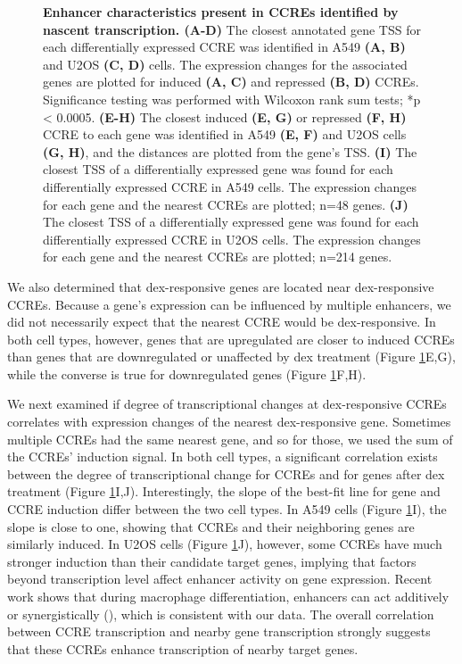 \documentclass{article}
\begin{document}
{\begin{figure}[hb]
\caption{\textbf{Enhancer characteristics present in CCREs identified by nascent transcription. (A-D)} The closest annotated gene TSS for each differentially expressed CCRE was identified in A549 \textbf{(A, B)} and U2OS \textbf{(C, D)} cells. The expression changes for the associated genes are plotted for induced \textbf{(A, C)} and repressed \textbf{(B, D)} CCREs. Significance testing was performed with Wilcoxon rank sum tests; *p < 0.0005. \textbf{(E-H)} The closest induced \textbf{(E, G)} or repressed \textbf{(F, H)} CCRE to each gene was identified in A549 \textbf{(E, F)} and U2OS cells \textbf{(G, H)}, and the distances are plotted from the gene’s TSS. \textbf{(I)} The closest TSS of a differentially expressed gene was found for each differentially expressed CCRE in A549 cells. The expression changes for each gene and the nearest CCREs are plotted; n=48 genes. \textbf{(J)} The closest TSS of a differentially expressed gene was found for each differentially expressed CCRE in U2OS cells. The expression changes for each gene and the nearest CCREs are plotted; n=214 genes.}
\label{fig:fig4}
\end{figure}
We also determined that dex-responsive genes are located near dex-responsive CCREs. Because a gene’s expression can be influenced by multiple enhancers, we did not necessarily expect that the nearest CCRE would be dex-responsive. In both cell types, however, genes that are upregulated are closer to induced CCREs than genes that are downregulated or unaffected by dex treatment (Figure \ref{fig:fig4}E,G), while the converse is true for downregulated genes (Figure \ref{fig:fig4}F,H).  

We next examined if degree of transcriptional changes at dex-responsive CCREs correlates with expression changes of the nearest dex-responsive gene. Sometimes multiple CCREs had the same nearest gene, and so for those, we used the sum of the CCREs’ induction signal. In both cell types, a significant correlation exists between the degree of transcriptional change for CCREs and for genes after dex treatment (Figure \ref{fig:fig4}I,J). Interestingly, the slope of the best-fit line for gene and CCRE induction differ between the two cell types. In A549 cells (Figure \ref{fig:fig4}I), the slope is close to one, showing that CCREs and their neighboring genes are similarly induced. In U2OS cells (Figure \ref{fig:fig4}J), however, some CCREs have much stronger induction than their candidate target genes, implying that factors beyond transcription level affect enhancer activity on gene expression. Recent work shows that during macrophage differentiation, enhancers can act additively or synergistically (\cite{choi_evidence_2021}), which is consistent with our data. The overall correlation between CCRE transcription and nearby gene transcription strongly suggests that these CCREs enhance transcription of nearby target genes.

}
\end{document}
